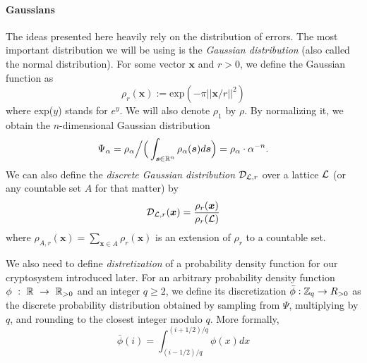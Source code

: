 \paragraph{Gaussians}
The ideas presented here heavily rely on the distribution of errors. The most important distribution we will be using is the \textit{Gaussian distribution} (also called the normal distribution). For some vector $\bm{x}$ and $r>0$, we define the Gaussian function as
\[ \rho_r (\bm{x}) := \text{exp}(- \pi ||\bm{x}/r||^2) \]
where exp($y$) stands for $e^y$. We will also denote $\rho_1$ by $\rho$. By normalizing it, we obtain the $n$-dimensional Gaussian distribution
\[\Psi_{\alpha} = \rho_{\alpha} \Big/ \Big( \int_{\boldsymbol{s} \in \mathbb{R}^n} \rho_{\alpha}(\boldsymbol{s}) d\boldsymbol{s} \Big) = \rho_{\alpha} \cdot \alpha^{-n}. \]
We can also define the \textit{discrete Gaussian distribution} $\mathcal{D}_{\mathcal{L}, r}$ over a lattice $\mathcal{L}$ (or any countable set $A$ for that matter) by
\begin{equation} \mathcal{D}_{\mathcal{L}, r}(\boldsymbol{x}) = \frac{\rho_r(\boldsymbol{x})}{\rho_r(\mathcal{L})} \end{equation}
where $\rho_{A, r}(\bm{x}) = \sum_{\bm{x} \in A} \rho_r(\bm{x})$ is an extension of $\rho_r$ to a countable set.

\iffalse
\krzys{i dont think ill include this part about Psi beta at all}
In order to avoid making our proofs depend on the specific choice of modulus $q$, we now define the family of Gaussian distributions over $\T = \R/\Z = [0,1)$ - a periodization of the normal distribution. More specifically, following \cite{regev}, for $\beta \in \R_{> 0}$ define $\Psi_{\beta}$ as the distribution on $\T$ obtained by sampling from a normal variable with mean 0 and standard deviation $\frac{\beta}{\sqrt{2\pi}}$ and reducing the result modulo 1,
\begin{equation} \forall r \in [0,1), \Psi_{\beta}(r) := \sum_{k = -\infty}^{\infty} \frac{1}{\beta} \cdot \text{exp} \bigg(- \pi \Big(\frac{r-k}{\beta}\Big)^2\bigg). \end{equation}
\krzys{also, it turns out, that for whatever value of $r$ we pick, the result of that sum is always $|\beta|/\beta = 1$?????}
We will, for the sake of clearer notation, be a bit vague about the doman of $\Psi_{\beta}$. This is because sampling from $\Psi_{\beta}$ with parameter $\beta$, that is defined over $\T = [0,1)$ is equivalent to sampling from $\Psi_{q \beta}$ over $\Z_q$. \krzys{i am very hesitant about this statement - need to check if thats true}
\fi

We also need to define \textit{distretization} of a probability density function for our cryptosystem introduced later. For an arbitrary probability density function $\phi~:~\mathbb{R}~\to~\mathbb{R}_{>0}$ and an integer $q \geq 2$, we define its discretization $\bar{\phi} : \mathbb{Z}_q \rightarrow R_{>0}$ as the discrete probability distribution obtained by sampling from $\Psi$, multiplying by $q$, and rounding to the closest integer modulo $q$. More formally,
\begin{equation} \bar{\phi}(i) = \int_{(i -1/2)/q}^{(i + 1/2)/q} \phi(x) dx \end{equation}

